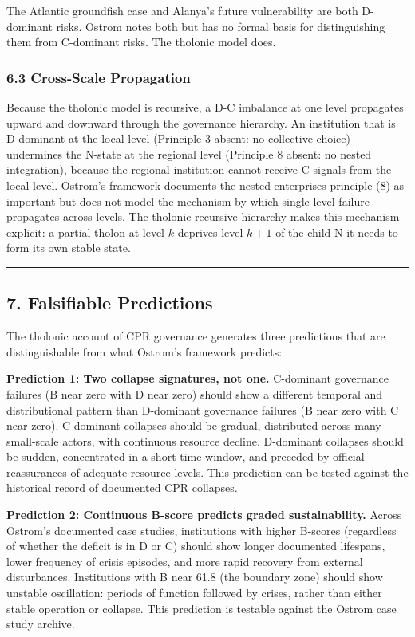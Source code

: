 \documentclass[
  11pt,
  letterpaper,
]{article}
\begin{document}
The Atlantic groundfish case and Alanya's future vulnerability are both
D-dominant risks. Ostrom notes both but has no formal basis for
distinguishing them from C-dominant risks. The tholonic model does.

\subsubsection{6.3 Cross-Scale
Propagation}\label{cross-scale-propagation}

Because the tholonic model is recursive, a D-C imbalance at one level
propagates upward and downward through the governance hierarchy. An
institution that is D-dominant at the local level (Principle 3 absent:
no collective choice) undermines the N-state at the regional level
(Principle 8 absent: no nested integration), because the regional
institution cannot receive C-signals from the local level. Ostrom's
framework documents the nested enterprises principle (8) as important
but does not model the mechanism by which single-level failure
propagates across levels. The tholonic recursive hierarchy makes this
mechanism explicit: a partial tholon at level \(k\) deprives level
\(k+1\) of the child N it needs to form its own stable state.

\begin{center}\rule{0.5\linewidth}{0.5pt}\end{center}

\subsection{7. Falsifiable Predictions}\label{falsifiable-predictions}

The tholonic account of CPR governance generates three predictions that
are distinguishable from what Ostrom's framework predicts:

\textbf{Prediction 1: Two collapse signatures, not one.} C-dominant
governance failures (B near zero with D near zero) should show a
different temporal and distributional pattern than D-dominant governance
failures (B near zero with C near zero). C-dominant collapses should be
gradual, distributed across many small-scale actors, with continuous
resource decline. D-dominant collapses should be sudden, concentrated in
a short time window, and preceded by official reassurances of adequate
resource levels. This prediction can be tested against the historical
record of documented CPR collapses.

\textbf{Prediction 2: Continuous B-score predicts graded
sustainability.} Across Ostrom's documented case studies, institutions
with higher B-scores (regardless of whether the deficit is in D or C)
should show longer documented lifespans, lower frequency of crisis
episodes, and more rapid recovery from external disturbances.
Institutions with B near 61.8 (the boundary zone) should show unstable
oscillation: periods of function followed by crises, rather than either
stable operation or collapse. This prediction is testable against the
Ostrom case study archive.
\end{document}
